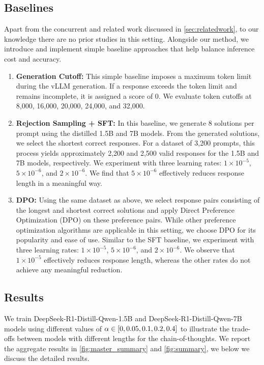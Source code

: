 \subsection{Baselines}
Apart from the concurrent and related work discussed in \cref{sec:relatedwork}, to our knowledge there are no prior studies in this setting.
Alongside our method, we introduce and implement simple baseline approaches that help balance inference cost and accuracy.
\begin{enumerate}
\item \textbf{Generation Cutoff:} This simple baseline imposes a maximum token limit during the vLLM generation. If a response exceeds the token limit and remains incomplete, it is assigned a score of 0. We evaluate token cutoffs at 8,000, 16,000, 20,000, 24,000, and 32,000.
\item \textbf{Rejection Sampling + SFT:} In this baseline, we generate 8 solutions per prompt using the distilled 1.5B and 7B models. From the generated solutions, we select the shortest correct responses. For a dataset of 3,200 prompts, this process yields approximately 2,200 and 2,500 valid responses for the 1.5B and 7B models, respectively. We experiment with three learning rates: \(1 \times 10^{-5}\), \(5 \times 10^{-6}\), and \(2 \times 10^{-6}\). We find that \(5 \times 10^{-6}\) effectively reduces response length in a meaningful way.

\item \textbf{DPO:} Using the same dataset as above, we select response pairs consisting of the longest and shortest correct solutions and apply Direct Preference Optimization (DPO) \cite{rafailov2023direct} on these preference pairs. While other preference optimization algorithms are applicable in this setting, we choose DPO for its popularity and ease of use. Similar to the SFT baseline, we experiment with three learning rates: \(1 \times 10^{-5}\), \(5 \times 10^{-6}\), and \(2 \times 10^{-6}\). We observe that \(1 \times 10^{-5}\) effectively reduces response length, whereas the other rates do not achieve any meaningful reduction. 
\end{enumerate}


\subsection{Results}

We train DeepSeek-R1-Distill-Qwen-1.5B and DeepSeek-R1-Distill-Qwen-7B models using different values of $\alpha \in [0, 0.05, 0.1, 0.2, 0.4]$ to 
illustrate the trade-offs between models with different lengths for the chain-of-thoughts.
We report the aggregate results in \cref{fig:master_summary} and \cref{fig:summary},
we below we discuss the detailed results.

